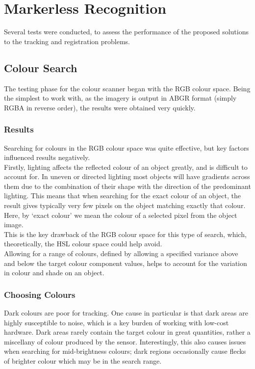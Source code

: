 \section{Markerless Recognition}
Several tests were conducted, to assess the performance of the proposed solutions to the tracking and registration problems.\\

\subsection{Colour Search}
The testing phase for the colour scanner began with the RGB colour space. Being the simplest to work with, as the imagery is output in ABGR format (simply RGBA in reverse order), the results were obtained very quickly.\\

\subsubsection{Results}
Searching for colours in the RGB colour space was quite effective, but key factors influenced results negatively.\\

Firstly, lighting affects the reflected colour of an object greatly, and is difficult to account for. In uneven or directed lighting most objects will have gradients across them due to the combination of their shape with the direction of the predominant lighting. This means that when searching for the exact colour of an object, the result gives typically very few pixels on the object matching exactly that colour. Here, by ‘exact colour’ we mean the colour of a selected pixel from the object image. \\

This is the key drawback of the RGB colour space for this type of search, which, theoretically, the HSL colour space could help avoid.\\
Allowing for a range of colours, defined by allowing a specified variance above and below the target colour component values, helps to account for the variation in colour and shade on an object.\\

\subsubsection{Choosing Colours}
Dark colours are poor for tracking. One cause in particular is that dark areas are highly susceptible to noise, which is a key burden of working with low-cost hardware. Dark areas rarely contain the target colour in great quantities, rather a miscellany of colour produced by the sensor. Interestingly, this also causes issues when searching for mid-brightness colours; dark regions occasionally cause flecks of brighter colour which may be in the search range.\\

